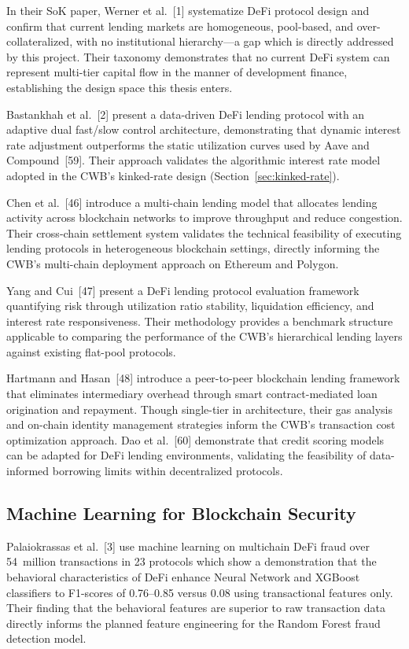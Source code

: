\documentclass[12pt,a4paper]{report}
\begin{document}
In their SoK paper, Werner et al.~[1] systematize DeFi protocol design and confirm that current lending markets are homogeneous, pool-based, and over-collateralized, with no institutional hierarchy---a gap which is directly addressed by this project. Their taxonomy demonstrates that no current DeFi system can represent multi-tier capital flow in the manner of development finance, establishing the design space this thesis enters.

Bastankhah et al.~[2] present a data-driven DeFi lending protocol with an adaptive dual fast/slow control architecture, demonstrating that dynamic interest rate adjustment outperforms the static utilization curves used by Aave and Compound~[59]. Their approach validates the algorithmic interest rate model adopted in the CWB's kinked-rate design (Section~\ref{sec:kinked-rate}).

Chen et al.~[46] introduce a multi-chain lending model that allocates lending activity across blockchain networks to improve throughput and reduce congestion. Their cross-chain settlement system validates the technical feasibility of executing lending protocols in heterogeneous blockchain settings, directly informing the CWB's multi-chain deployment approach on Ethereum and Polygon.

Yang and Cui~[47] present a DeFi lending protocol evaluation framework quantifying risk through utilization ratio stability, liquidation efficiency, and interest rate responsiveness. Their methodology provides a benchmark structure applicable to comparing the performance of the CWB's hierarchical lending layers against existing flat-pool protocols.

Hartmann and Hasan~[48] introduce a peer-to-peer blockchain lending framework that eliminates intermediary overhead through smart contract-mediated loan origination and repayment. Though single-tier in architecture, their gas analysis and on-chain identity management strategies inform the CWB's transaction cost optimization approach. Dao et al.~[60] demonstrate that credit scoring models can be adapted for DeFi lending environments, validating the feasibility of data-informed borrowing limits within decentralized protocols.

\subsection{Machine Learning for Blockchain Security}

Palaiokrassas et al.~[3] use machine learning on multichain DeFi fraud over 54~million transactions in 23 protocols which show a demonstration that the behavioral characteristics of DeFi enhance Neural Network and XGBoost classifiers to F1-scores of 0.76--0.85 versus 0.08 using transactional features only. Their finding that the behavioral features are superior to raw transaction data directly informs the planned feature engineering for the Random Forest fraud detection model.
\end{document}

